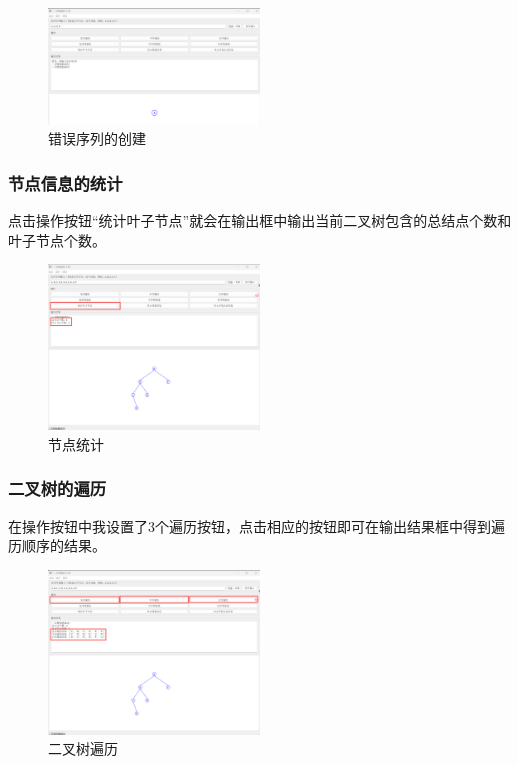 \documentclass[12pt,a4paper]{article}
\begin{document}
\begin{figure}[H]
    \centering
    \includegraphics[width=0.5\textwidth]{pt1-6.png}
    \caption{错误序列的创建}
\end{figure}

\subsubsection{节点信息的统计}

点击操作按钮“统计叶子节点”就会在输出框中输出当前二叉树包含的总结点个数和叶子节点个数。

\begin{figure}[H]
    \centering
    \includegraphics[width=0.5\textwidth]{pt1-7.png}
    \caption{节点统计}
\end{figure}

\subsubsection{二叉树的遍历}

在操作按钮中我设置了3个遍历按钮，点击相应的按钮即可在输出结果框中得到遍历顺序的结果。

\begin{figure}[H]
    \centering
    \includegraphics[width=0.5\textwidth]{pt1-8.png}
    \caption{二叉树遍历}
\end{figure}
\end{document}
